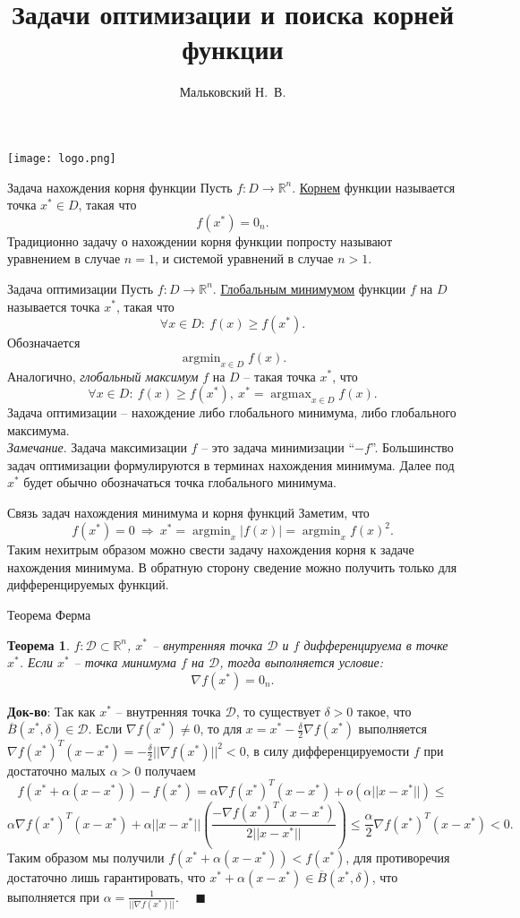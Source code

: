 \documentclass[10pt]{beamer}
\author{Мальковский Н.~В.}
\title[Введение]{Задачи оптимизации и поиска корней функции}
\institute[СПбAУ]{Санкт-Петербургский Академический Университет}
\date{}
\DeclareMathOperator*{\argmin}{argmin}
\DeclareMathOperator*{\argmax}{argmax}
\newtheorem{theorem_ru}{Теорема}[]
\begin{document}
\begin{frame}
\titlepage
\centering
\texttt{[image: logo.png]}
\end{frame}

\begin{frame}{Задача нахождения корня функции}
Пусть $f:D\rightarrow \mathbb{R}^n$. \underline{Корнем} функции называется точка $x^*\in D$, такая что 
$$
f(x^*)=0_n.
$$
Традиционно задачу о нахождении корня функции попросту называют уравнением в случае $n=1$, и системой уравнений в случае $n>1$.
\end{frame}

\begin{frame}{Задача оптимизации}
Пусть $f:D\rightarrow \mathbb{R}^n$. \underline{Глобальным минимумом} функции $f$ на $D$ называется точка $x^*$, такая что
$$
\forall x\in D:~f(x)\geq f(x^*).
$$
\pause
Обозначается$$
\argmin_{x\in D} f(x).
$$
\pause
Аналогично, \textit{глобальный максимум} $f$ на $D$ -- такая точка $x^*$, что
$$
\forall x\in D:~f(x)\geq f(x^*),~x^*=\argmax_{x\in D} f(x).
$$
\pause
Задача оптимизации -- нахождение либо глобального минимума, либо глобального максимума.\\
\vspace{1em}
\pause
\textit{Замечание}. Задача максимизации $f$ -- это задача минимизации ``$-f$''. Большинство задач оптимизации формулируются в терминах нахождения минимума. Далее под $x^*$ будет обычно обозначаться точка глобального минимума.
\end{frame}

\begin{frame}{Связь задач нахождения минимума и корня функций}
Заметим, что
$$
f(x^*)=0~\Rightarrow~x^*=\argmin_x|f(x)|=\argmin_xf(x)^2.
$$
\pause
Таким нехитрым образом можно свести задачу нахождения корня к задаче нахождения минимума. В обратную сторону сведение можно получить только для дифференцируемых функций.
\end{frame}
\begin{frame}{Теорема Ферма}
\begin{theorem_ru}
$f:\mathcal{D}\subset \mathbb{R}^n$, $x^*$ -- внутренняя точка $\mathcal{D}$ и $f$ дифференцируема в точке $x^*$. Если $x^*$ -- точка минимума $f$ на $\mathcal{D}$, тогда выполняется условие:
$$
\nabla f(x^*)=0_n.
$$
\end{theorem_ru}
\pause
\textbf{Док-во}:
Так как $x^*$ -- внутренняя точка $\mathcal{D}$, то существует $\delta>0$ такое, что $\overline{B}(x^*, \delta)\in \mathcal{D}$. Если $\nabla f(x^*)\neq 0$, то для
$x=x^*-\frac{\delta}{2}\nabla f(x^*)$ выполняется $\nabla f(x^*)^T(x-x^*)=-\frac{\delta}{2}||\nabla f(x^*)||^2<0$, в силу дифференцируемости $f$ при достаточно малых $\alpha>0$ получаем
$$
f(x^*+\alpha (x-x^*))-f(x^*)=\alpha\nabla f(x^*)^T(x-x^*)+o(\alpha||x-x^*||)\leq
$$
$$
 \alpha \nabla f(x^*)^T(x-x^*)+\alpha ||x-x^*||\left(\frac{-\nabla f(x^*)^T(x-x^*)}{2||x-x^*||}\right)\leq \frac{\alpha}{2}\nabla f(x^*)^T(x-x^*)<0.
$$
\pause
Таким образом мы получили $f(x^*+\alpha(x-x^*))<f(x^*)$, для противоречия достаточно лишь гарантировать, что $x^*+\alpha (x-x^*)\in\overline{B}(x^*, \delta)$, что выполняется при $\alpha=\frac{1}{||\nabla f(x^*)||}$.~~ $\blacksquare$ 
\end{frame}
\end{document}
